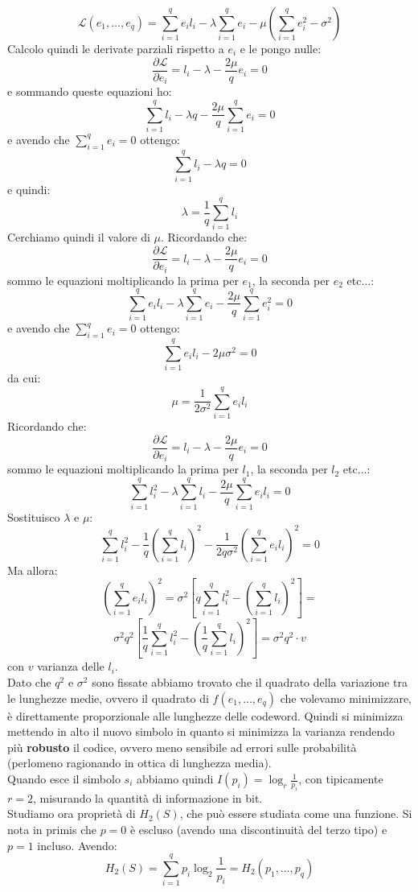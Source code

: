 \documentclass[a4paper,12pt, oneside]{book}
\begin{document}
\[\mathcal{L}(e_1,\ldots,e_q)=\sum_{i=1}^qe_il_i-\lambda\sum_{i=1}^q
  e_i-\mu\left(\sum_{i=1}^q e_i^2-\sigma^2\right)\] 
Calcolo quindi le derivate parziali rispetto a $e_i$ e le pongo nulle:
\[\frac{\partial\mathcal{L}}{\partial e_i}=l_i-\lambda-\frac{2\mu}{q}e_i=0\]
e sommando queste equazioni ho:
\[\sum_{i=1}^q l_i-\lambda q-\frac{2\mu}{q}\sum_{i=1}^q e_i=0\]
e avendo che $\sum_{i=1}^qe_i=0$ ottengo:
\[\sum_{i=1}^q l_i-\lambda q=0\]
e quindi:
\[\lambda=\frac{1}{q}\sum_{i=1}^q l_i\]
Cerchiamo quindi il valore di $\mu$.
Ricordando che:
\[\frac{\partial\mathcal{L}}{\partial e_i}=l_i-\lambda-\frac{2\mu}{q}e_i=0\]
sommo le equazioni moltiplicando la prima per $e_1$, la seconda per $e_2 $
etc$\ldots$:
\[\sum_{i=1}^q e_il_i-\lambda \sum_{i=1}^q e_i-\frac{2\mu}{q}\sum_{i=1}^q e_i^2=0\]
e avendo che $\sum_{i=1}^qe_i=0$ ottengo:
\[\sum_{i=1}^q e_il_i-2\mu\sigma^2=0\]
da cui:
\[\mu=\frac{1}{2\sigma^2}\sum_{i=1}^qe_il_i\]
Ricordando che:
\[\frac{\partial\mathcal{L}}{\partial e_i}=l_i-\lambda-\frac{2\mu}{q}e_i=0\]
sommo le equazioni moltiplicando la prima per $l_1$, la seconda per $l_2 $
etc$\ldots$:
\[\sum_{i=1}^q l_i^2-\lambda \sum_{i=1}^q l_i-\frac{2\mu}{q}\sum_{i=1}^q
  e_il_i=0\]
Sostituisco $\lambda$ e $\mu$:
\[\sum_{i=1}^q l_i^2- \frac{1}{q}\left(\sum_{i=1}^q l_i\right)^2-
  \frac{1}{2q\sigma^2}\left(\sum_{i=1}^qe_il_i\right)^2=0\]
Ma allora:
\[\left(\sum_{i=1}^qe_il_i\right)^2=\sigma^2\left[q\sum_{i=1}^q
    l_i^2-\left(\sum_{i=1}^q
      l_i\right)^2\right]=\]
\[\sigma^2q^2\left[\frac{1}{q}\sum_{i=1}^q
    l_i^2-\left(\frac{1}{q}\sum_{i=1}^q l_i\right)^2\right]=\sigma^2q^2\cdot v\]
con $v$ varianza delle $l_i$.\\
Dato che $q^2$ e $\sigma^2$ sono fissate abbiamo trovato che il quadrato della
variazione tra le lunghezze medie, ovvero il quadrato di $f(e_1,\ldots,e_q)$ che
volevamo minimizzare, è direttamente proporzionale alle lunghezze delle
codeword. Quindi si minimizza mettendo in alto il nuovo simbolo in quanto si
minimizza la varianza rendendo più \textbf{robusto} il codice, ovvero meno
sensibile ad errori sulle probabilità (perlomeno ragionando in ottica di
lunghezza media).\\
Quando esce il simbolo $s_i$ abbiamo quindi $I(p_i)=\log_r \frac{1}{p_i}$, con
tipicamente $r=2$, misurando la quantità di informazione in bit.\\
Studiamo ora proprietà di $H_2(S)$, che può essere studiata come una
funzione. Si nota in primis che $p=0$ è escluso (avendo una discontinuità del
terzo tipo) e $p=1$ incluso. Avendo:
\[H_2(S)=\sum_{i=1}^q p_i\log_2\frac{1}{p_i}=H_2(p_1,\ldots, p_q)\]
\end{document}
